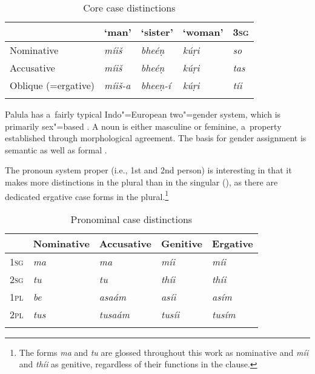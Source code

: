 \begin{table}[ht]
\caption{Core case distinctions}
\begin{tabularx}{\textwidth}{ l@{\hspace{25pt}} Q Q Q Q }
\lsptoprule
&
`man' &
`sister' &
`woman' &
\textsc{3sg}
\\\hline
Nominative &
\textit{míiš} &
\textit{bheéṇ} &
\textit{kúṛi} &
\textit{so} \\
Accusative &
\textit{míiš} &
\textit{bheéṇ} &
\textit{kúṛi} &
\textit{tas} \\
Oblique (=ergative) &
\textit{míiš-a} &
\textit{bheeṇ-í} &
\textit{kúṛi} &
\textit{tíi}
\\\lspbottomrule
\end{tabularx}
\label{tab:2-case}
\end{table}


Palula has a~fairly typical Indo"=European two"=gender system, which is primarily sex"=based \citep{corbett_sex-based_2013}. A noun is either masculine or feminine, a~property established through morphological agreement. The basis for gender assignment is semantic as well as formal \citep{corbett_systems_2013}.


The pronoun system proper (i.e., 1st and 2nd person) is interesting in that it makes more distinctions in the plural than in the singular (), as there are dedicated ergative case forms in the plural.\footnote{The forms \textit{ma} and \textit{tu} are glossed throughout this work as nominative and \textit{míi} and \textit{thíi} as genitive, regardless of their functions in the clause.}

\begin{table}[ht]
\caption{Pronominal case distinctions}
\begin{tabularx}{\textwidth}{ l Q Q Q Q }
\lsptoprule
&
Nominative &
Accusative &
Genitive &
Ergative
\\\hline
\textsc{1sg} &
\textit{ma} &
\textit{ma} &
\textit{míi} &
\textit{míi} \\
\textsc{2sg} &
\textit{tu} &
\textit{tu} &
\textit{thíi} &
\textit{thíi} \\
\textsc{1pl} &
\textit{be} &
\textit{asaám} &
\textit{asíi} &
\textit{asím} \\
\textsc{2pl} &
\textit{tus} &
\textit{tusaám} &
\textit{tusíi} &
\textit{tusím} 
\\\lspbottomrule
\end{tabularx}
\label{tab:2-pron}
\end{table}



